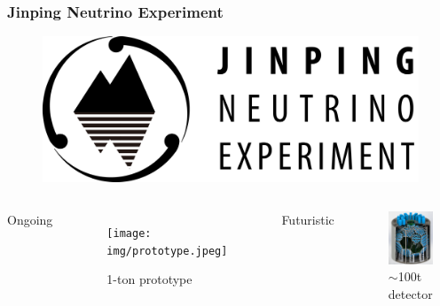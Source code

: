 \documentclass{beamer}
\begin{document}
\begin{frame}
\frametitle{Jinping Neutrino Experiment}
\setlength{\abovecaptionskip}{-2mm}
\begin{figure}
    \centering
    \includegraphics[width=0.3\linewidth]{img/J.png}
\end{figure}
\vspace{-4mm}
\begin{columns}
\begin{center}
    Ongoing
\end{center}
\begin{figure}
    \centering
    \caption{1-ton prototype}
    \texttt{[image: img/prototype.jpeg]}
\end{figure}
\begin{center}
    Futuristic
\end{center}
\begin{figure}
    \centering
    \caption{$\sim$100t detector}
    \includegraphics[width=0.6\linewidth]{img/100tondetector.png}
\end{figure}
\end{columns}
\end{frame}
\end{document}
